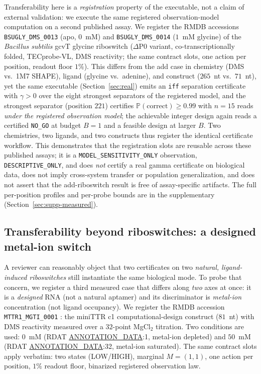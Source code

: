 \documentclass[11pt]{article}
\begin{document}
Transferability here is a \emph{registration} property of the executable, not a claim of external
validation: we execute the same registered observation-model computation on a second published assay. We
register the RMDB accessions \texttt{BSUGLY\_DMS\_0013} (apo, $0$~mM) and \texttt{BSUGLY\_DMS\_0014}
($1$~mM glycine) of the \emph{Bacillus subtilis} gcvT glycine riboswitch ($\Delta$P0 variant,
co-transcriptionally folded, TECprobe-VL, DMS reactivity; the same contract slots, one action per
position, readout floor $1\%$). This differs from the add case in chemistry (DMS vs.\ 1M7 SHAPE),
ligand (glycine vs.\ adenine), and construct ($265$~nt vs.\ $71$~nt), yet the same executable
(Section~\ref{sec:real}) emits an \texttt{iff} separation certificate with $\gamma>0$ over the eight
strongest separators of the registered model, and the strongest separator (position $221$) certifies
$\mathbb{P}(\mathrm{correct})\ge0.99$ with $n=15$ reads \emph{under the registered observation model};
the achievable integer design again reads a certified \texttt{NO\_GO} at budget $B=1$ and a feasible
design at larger $B$. Two chemistries, two ligands, and two constructs thus register the identical
certificate workflow. This demonstrates that the registration slots are reusable across these published
assays; it is a \texttt{MODEL\_SENSITIVITY\_ONLY} observation, \texttt{DESCRIPTIVE\_ONLY}, and does
\emph{not} certify a real gamma certificate on biological data, does not imply cross-system transfer or
population generalization, and does not assert that the add-riboswitch result is free of assay-specific
artifacts. The full per-position profiles and per-probe bounds are in the supplementary
(Section~\ref{sec:supp-measured}).

\subsection{Transferability beyond riboswitches: a designed metal-ion switch}\label{sec:real-mattr}
A reviewer can reasonably object that two certificates on two \emph{natural, ligand-induced
riboswitches} still instantiate the same biological mode. To probe that concern, we register a third
measured case that differs along \emph{two} axes at once: it is a \emph{designed} RNA (not a natural
aptamer) and its discriminator is \emph{metal-ion} concentration (not ligand occupancy). We register
the RMDB accession \texttt{MTTR1\_MGTI\_0001} \citep{yesselman2019computational}: the miniTTR c1
computational-design construct ($81$~nt) with DMS
reactivity measured over a $32$-point MgCl$_{2}$ titration. Two conditions are used: $0$~mM (RDAT
\underline{ANNOTATION\_DATA}:1, metal-ion depleted) and $50$~mM (RDAT \underline{ANNOTATION\_DATA}:32,
metal-ion saturated). The same contract slots apply verbatim: two states (LOW/HIGH), marginal
$M=(1,1)$, one action per position, $1\%$ readout floor, binarized registered observation law.
\end{document}
